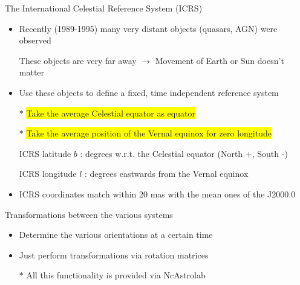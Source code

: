 \Tr
\begin{center}
{\red The International Celestial Reference System (ICRS)}
\end{center}
%
\begin{itemize}
\item Recently (1989-1995) many very distant objects (quasars, AGN) were observed
\item[] These objects are very far away $\rightarrow$ Movement of Earth or Sun doesn't matter
\item Use these objects to define a fixed, time independent reference system
\item[$\ast$] \colorbox{yellow}{Take the average Celestial equator as equator}
\item[$\ast$] \colorbox{yellow}{Take the average position of the Vernal equinox for zero longitude}
\item[] {\blue ICRS latitude $b$} : degrees w.r.t. the Celestial equator (North +, South -)
\item[] {\blue ICRS longitude $l$} : degrees eastwards from the Vernal equinox
\item ICRS coordinates match within 20 mas with the mean ones of the J2000.0
\end{itemize}
%
\begin{center}
{\red Transformations between the various systems}
\end{center}
%
\begin{itemize}
\item Determine the various orientations at a certain time
\item Just perform transformations via rotation matrices
\item[$\ast$] {\blue All this functionality is provided via NcAstrolab}
\end{itemize}